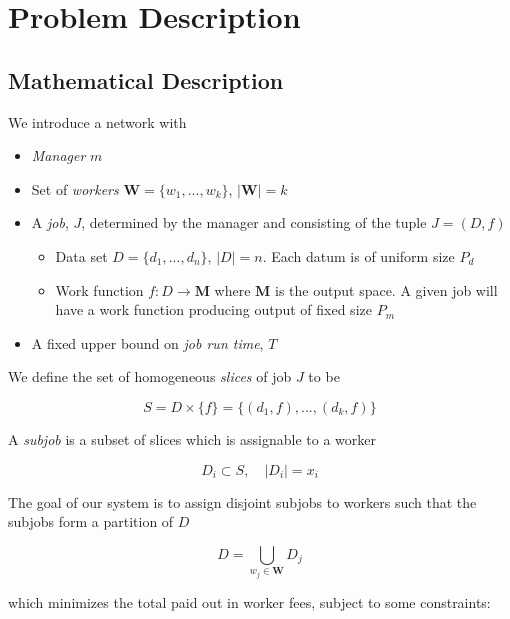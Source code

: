 \documentclass[../mthe-493-final-project.tex]{subfiles}
\begin{document}
    \chapter{Problem Description}
    \label{ch:problem-description}
    
    \section{Mathematical Description}
    
    We introduce a network with
    
    \begin{itemize}
        \item \textit{Manager} $m$
        \item Set of \textit{workers} $\mathbf{W} = \{w_1, ..., w_k\}$, $\vert\mathbf{W}\vert = k$
        \item A \textit{job}, $J$, determined by the manager and consisting of the tuple $J = (D, f)$
            \begin{itemize}
                \item Data set $D = \{d_1, ..., d_n\}$, $\vert D\vert = n$. Each datum is of uniform size $P_d$
                \item Work function $f: D \rightarrow \mathbf{M}$ where $\mathbf{M}$ is the output space. A given job will have a work function producing output of fixed size $P_m$
            \end{itemize}
        \item A fixed upper bound on \textit{job run time}, $T$
    \end{itemize}
    
    We define the set of homogeneous \textit{slices} of job $J$ to be 
    
    \[S = D \times \{f\} = \{(d_1, f), ..., (d_k, f)\}\]
    
    A \textit{subjob} is a subset of slices which is assignable to a worker
    
    \[D_i \subset S, \quad \vert D_i \vert = x_i\]
    
    The goal of our system is to assign disjoint subjobs to workers such that the subjobs form a partition of $D$
    
    \[D = \bigcup\limits_{w_j \in \mathbf{W}} D_j\]
    
    which minimizes the total paid out in worker fees, subject to some constraints:
    
\end{document}
